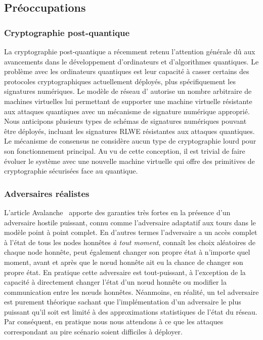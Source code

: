 \documentclass[runningheads,francais,a4paper]{llncs}
\begin{document}
\subsection{Préoccupations}
\subsubsection{Cryptographie post-quantique}
La cryptographie post-quantique a récemment retenu l'attention générale dû aux avancements dans le développement
d'ordinateurs et d'algorithmes quantiques. Le problème avec les ordinateurs quantiques est leur capacité à casser
certains des protocoles cryptographiques actuellement déployés, plus spécifiquement les signatures numériques. Le modèle
de réseau d'\AVAPlatformName{} autorise un nombre arbitraire de machines virtuelles lui permettant de supporter une
machine virtuelle résistante aux attaques quantiques avec un mécanisme de signature numérique approprié. Nous
anticipons plusieurs types de schémas de signatures numériques pouvant être déployés, incluant les signatures RLWE
résistantes aux attaques quantiques. Le mécanisme de consensus ne considère aucun type de cryptographie lourd pour son
fonctionnement principal. Au vu de cette conception, il est trivial de faire évoluer le système avec une nouvelle
machine virtuelle qui offre des primitives de cryptographie sécurisées face au quantique.

\subsubsection{Adversaires réalistes}
L'article Avalanche~\cite{avalanche} apporte des garanties très fortes en la présence d'un adversaire hostile puissant,
connu comme l'adversaire adaptatif aux tours dans le modèle point à point complet. En d'autres termes l'adversaire a un
accès complet à l'état de tous les nodes honnêtes \emph{à tout moment}, connaît les choix aléatoires de chaque node
honnête, peut également changer son propre état à n'importe quel moment, avant et après que le nœud honnête ait eu la
chance de changer son propre état. En pratique cette adversaire est tout-puissant, à l'exception de la capacité à
directement changer l'état d'un nœud honnête ou modifier la communication entre les nœuds honnêtes. Néanmoins, en
réalité, un tel adversaire est purement théorique sachant que l'implémentation d'un adversaire le plus puissant qu'il
soit est limité à des approximations statistiques de l'état du réseau. Par conséquent, en pratique nous nous attendons
à ce que les attaques correspondant au pire scénario soient difficiles à déployer.
\end{document}
